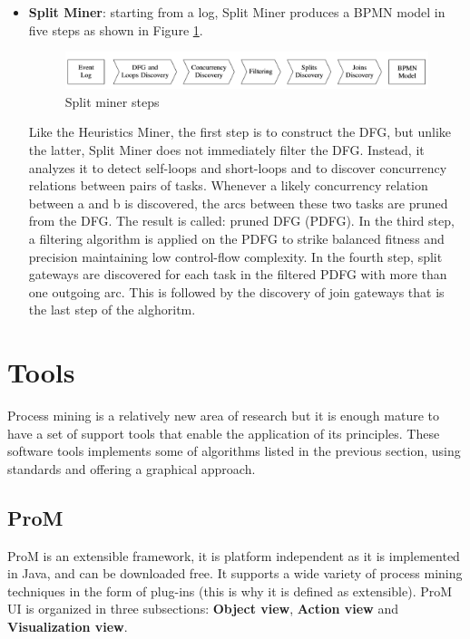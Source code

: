 \begin{itemize}
    \item \textbf{Split Miner}: 
    starting from a log, Split Miner produces a BPMN model in five steps as shown in Figure \ref{images:split_miner_steps}.

    \begin{figure}[!ht]
        \centering
    \includegraphics[width=\textwidth]{images/split_miner_steps.png}
        \caption{Split miner steps \cite{DBLP:conf/icdm/SplitMiner}}
        \label{images:split_miner_steps}
    \end{figure}

    Like the Heuristics Miner, the first step is to construct the DFG, but unlike the latter, Split Miner does not immediately 
    filter the DFG. Instead, it analyzes it to detect self-loops and short-loops and to discover concurrency relations 
    between pairs of tasks. Whenever a likely concurrency relation between a and b is discovered, the arcs between these two 
    tasks are pruned from the DFG. The result is called: pruned DFG (PDFG). In the third step, a filtering algorithm is 
    applied on the PDFG to strike balanced fitness and precision maintaining low control-flow complexity. In the fourth step, 
    split gateways are discovered for each task in the filtered PDFG with more than one outgoing arc. This is followed by the 
    discovery of join gateways that is the last step of the alghoritm.
    
\end{itemize}


\section{Tools}
\label{process_mining:tools}

Process mining is a relatively new area of research but it is enough mature to have a set of support tools that enable the 
application of its principles. These software tools implements some of algorithms listed in the previous section, using 
standards and offering a graphical approach.

\subsection{ProM}
ProM is an extensible framework, it is platform independent as it is implemented in Java, and can be downloaded free.
It supports a wide variety of process mining techniques in the form of plug-ins (this is why it is defined as extensible). 
ProM UI is organized in three subsections: \textbf{Object view}, \textbf{Action view} and \textbf{Visualization view}.

